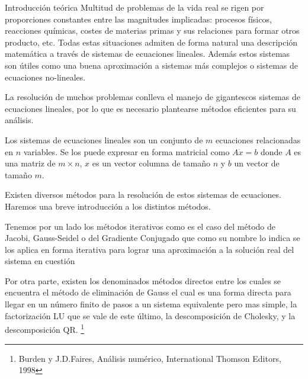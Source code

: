 \begin{section}{Introducción teórica}	
	Multitud de problemas de la vida real se rigen por proporciones constantes entre las magnitudes implicadas: procesos físicos, reacciones químicas, costes de materias primas y sus relaciones para formar otros producto, etc.
	Todas estas situaciones admiten de forma natural una descripción matemática a través de sistemas de ecuaciones lineales.
	Además estos sistemas son útiles como una buena aproximación a sistemas más complejos o sistemas de ecuaciones no-lineales.
	
	La resolución de muchos problemas conlleva el manejo de gigantescos sistemas de ecuaciones lineales, por lo que es necesario plantearse métodos eficientes para su análisis.
	
	Los sistemas de ecuaciones lineales son un conjunto de $m$ ecuaciones relacionadas en $n$ variables. Se los puede expresar en forma matricial como $A \dot x = b$ donde $A$ es una matriz de $m \times n$, $x$ es un vector columna de tamaño $n$ y $b$ un vector de tamaño $m$.
	
	Existen diversos métodos para la resolución de estos sistemas de ecuaciones. Haremos una breve introducción a los distintos métodos.
	
	Tenemos por un lado los métodos iterativos como es el caso del método de Jacobi, Gauss-Seidel o del Gradiente Conjugado que como su nombre lo indica se los aplica en forma iterativa para lograr una aproximación a la solución real del sistema en cuestión
	
	Por otra parte, existen los denominados métodos directos entre los cuales se encuentra el método de eliminación de Gauss el cual es una forma directa para llegar en un número finito de pasos a un sistema equivalente pero mas simple, la factorización LU que se vale de este último, la descomposición de Cholesky, y la descomposición QR.	\footnote{Burden y J.D.Faires, Análisis numérico, International Thomson Editors, 1998}
\end{section}
